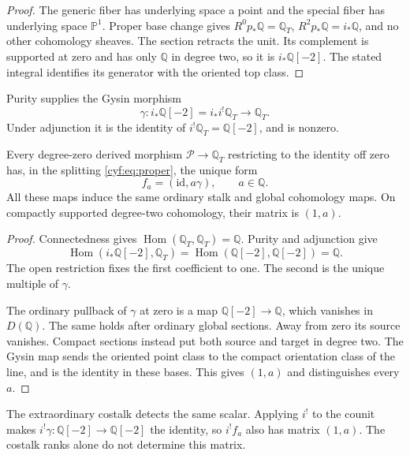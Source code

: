 \begin{proof}
The generic fiber has underlying space a point and the
special fiber has underlying space \(\mathbb P^1\).
Proper base change gives \(R^0p_*\mathbb Q=\mathbb Q_T\),
\(R^2p_*\mathbb Q=i_*\mathbb Q\), and no other cohomology
sheaves. The section retracts the unit. Its complement is
supported at zero and has only \(\mathbb Q\) in degree two,
so it is \(i_*\mathbb Q[-2]\). The stated integral
identifies its generator with the oriented top class.
\end{proof}

Purity supplies the Gysin morphism
\[
 \gamma:i_*\mathbb Q[-2]=i_*i^!\mathbb Q_T
                                      \longrightarrow\mathbb Q_T.
\]
Under adjunction it is the identity of
\(i^!\mathbb Q_T=\mathbb Q[-2]\), and is nonzero.

\begin{theorem}\label{cyf:thm:gysin}
Every degree-zero derived morphism
\(\mathscr P\to\mathbb Q_T\) restricting to the identity
off zero has, in the splitting \eqref{cyf:eq:proper},
the unique form
\begin{equation}\label{cyf:eq:gysin-family}
                         f_a=(\mathrm{id},a\gamma),
                         \qquad a\in\mathbb Q.
\end{equation}
All these maps induce the same ordinary stalk and global
cohomology maps. On compactly supported degree-two
cohomology, their matrix is \((1,a)\).
\end{theorem}

\begin{proof}
Connectedness gives
\(\operatorname{Hom}(\mathbb Q_T,\mathbb Q_T)=\mathbb Q\).
Purity and adjunction give
\[
 \operatorname{Hom}(i_*\mathbb Q[-2],\mathbb Q_T)
 =\operatorname{Hom}(\mathbb Q[-2],\mathbb Q[-2])=\mathbb Q.
\]
The open restriction fixes the first coefficient to one.
The second is the unique multiple of \(\gamma\).

The ordinary pullback of \(\gamma\) at zero is a map
\(\mathbb Q[-2]\to\mathbb Q\), which vanishes in
\(D(\mathbb Q)\). The same holds after ordinary global
sections. Away from zero its source vanishes. Compact
sections instead put both source and target in degree two.
The Gysin map sends the oriented point class to the compact
orientation class of the line, and is the identity in these
bases. This gives \((1,a)\) and distinguishes every \(a\).
\end{proof}

The extraordinary costalk detects the same scalar.
Applying \(i^!\) to the counit makes
\(i^!\gamma:\mathbb Q[-2]\to\mathbb Q[-2]\) the
identity, so \(i^!f_a\) also has matrix \((1,a)\).
The costalk ranks alone do not determine this matrix.

